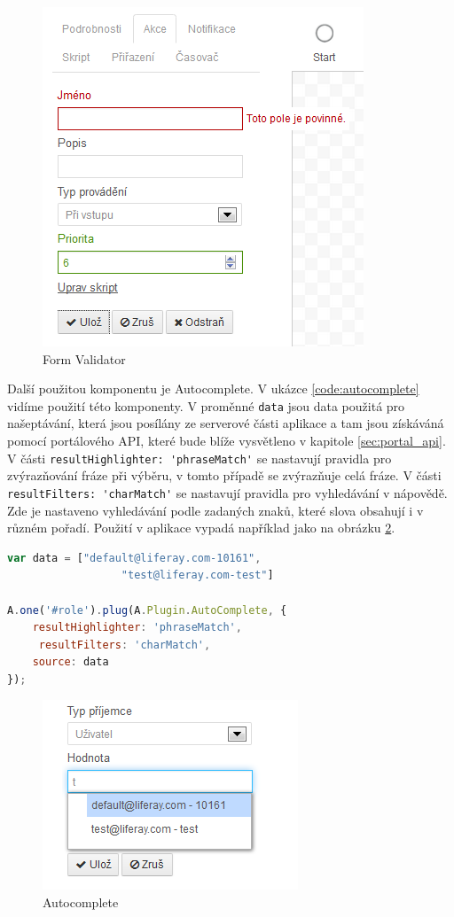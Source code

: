\documentclass{fithesis}
\begin{document}
\begin{figure}[htp]
\centering
\includegraphics{images/validator.png}
\caption{Form Validator}
\label{fig:validator}
\end{figure}

Další použitou komponentu  je Autocomplete. V ukázce \ref{code:autocomplete} vidíme použití této komponenty. V proměnné \verb|data| jsou data použitá pro našeptávání, která jsou posílány ze serverové části aplikace a tam jsou získáváná pomocí portálového API, které bude blíže vysvětleno v kapitole \ref{sec:portal_api}. V části \verb|resultHighlighter: 'phraseMatch'| se nastavují pravidla pro zvýrazňování fráze při výběru, v tomto případě se zvýrazňuje celá fráze. V části \verb|resultFilters: 'charMatch'| se  nastavují pravidla pro vyhledávání v nápovědě. Zde je nastaveno  vyhledávání podle zadaných znaků, které slova obsahují i v různém pořadí. Použití v aplikace vypadá například jako na obrázku \ref{fig:autocomplete}.

\begin{lstlisting}[language=JavaScript, float =h , caption = Použítí komponenty autocomplete , label = code:autocomplete ]
var data = ["default@liferay.com-10161", 
                  "test@liferay.com-test"]

A.one('#role').plug(A.Plugin.AutoComplete, {
	resultHighlighter: 'phraseMatch', 
     resultFilters: 'charMatch',
	source: data
});
\end{lstlisting}



\begin{figure}[htp]
\centering
\includegraphics{images/autocomplete.png}
\caption{Autocomplete}
\label{fig:autocomplete}
\end{figure}
\end{document}
